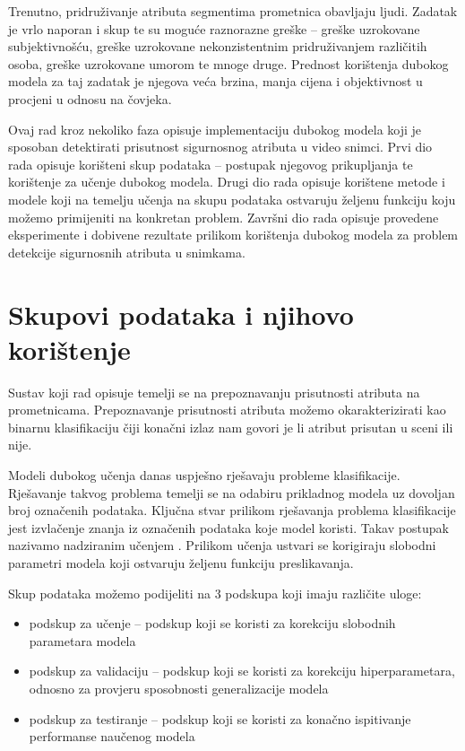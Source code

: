 \documentclass[times, utf8, diplomski, numeric]{fer}
\begin{document}
Trenutno, pridruživanje atributa segmentima prometnica obavljaju ljudi. 
Zadatak je vrlo naporan i skup te su moguće raznorazne greške -- greške uzrokovane subjektivnošću, greške uzrokovane nekonzistentnim pridruživanjem različitih osoba, greške uzrokovane umorom te mnoge druge.
Prednost korištenja dubokog modela za taj zadatak je njegova veća brzina, manja cijena i objektivnost u procjeni u odnosu na čovjeka.

Ovaj rad kroz nekoliko faza opisuje implementaciju dubokog modela koji je sposoban detektirati prisutnost sigurnosnog atributa u video snimci.
Prvi dio rada opisuje korišteni skup podataka -- postupak njegovog prikupljanja te korištenje za učenje dubokog modela.
Drugi dio rada opisuje korištene metode i modele koji na temelju učenja na skupu podataka ostvaruju željenu funkciju koju možemo primijeniti na konkretan problem.
Završni dio rada opisuje provedene eksperimente i dobivene rezultate prilikom korištenja dubokog modela za problem detekcije sigurnosnih atributa u snimkama.


\chapter{Skupovi podataka i njihovo korištenje} \label{chapter:skupovi_podataka}

Sustav koji rad opisuje temelji se na prepoznavanju prisutnosti atributa na prometnicama. 
Prepoznavanje prisutnosti atributa možemo okarakterizirati kao binarnu klasifikaciju čiji konačni izlaz nam govori je li atribut prisutan u sceni ili nije.

Modeli dubokog učenja danas uspješno rješavaju probleme klasifikacije. Rješavanje takvog problema temelji se na odabiru prikladnog modela uz dovoljan broj označenih podataka. 
Ključna stvar prilikom rješavanja problema klasifikacije jest izvlačenje znanja iz označenih podataka koje model koristi. Takav postupak nazivamo nadziranim učenjem \citep{book:deeplearningbook}. 
Prilikom učenja ustvari se korigiraju slobodni parametri modela koji ostvaruju željenu funkciju preslikavanja.

Skup podataka možemo podijeliti na 3 podskupa koji imaju različite uloge:
\begin{itemize}
 \item podskup za učenje -- podskup koji se koristi za korekciju slobodnih parametara modela
 \item podskup za validaciju -- podskup koji se koristi za korekciju hiperparametara, odnosno za provjeru sposobnosti generalizacije modela
 \item podskup za testiranje -- podskup koji se koristi za konačno ispitivanje performanse naučenog modela
\end{itemize}
\end{document}
